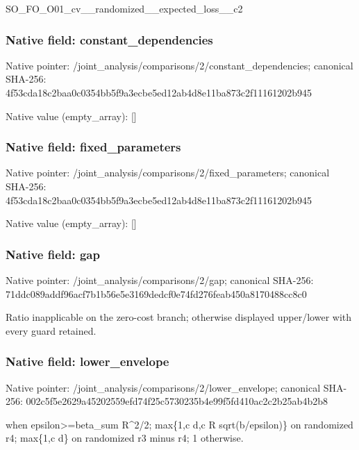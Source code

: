 \documentclass[10pt,a4paper]{article}
\begin{document}
\begingroup\raggedright\sloppy SO\_\allowbreak{}FO\_\allowbreak{}O01\_\allowbreak{}cv\_\allowbreak{}\_\allowbreak{}randomized\_\allowbreak{}\_\allowbreak{}expected\_\allowbreak{}loss\_\allowbreak{}\_\allowbreak{}c2\par\endgroup

\subsubsection{Native field: constant\_\allowbreak{}dependencies}
Native pointer: /joint\_\allowbreak{}analysis/comparisons/2/constant\_\allowbreak{}dependencies; canonical SHA-256: 4f53cda18c2baa0c0354bb5f9a3ecbe5ed12ab4d8e11ba873c2f11161202b945

Native value (empty\_\allowbreak{}array): []

\subsubsection{Native field: fixed\_\allowbreak{}parameters}
Native pointer: /joint\_\allowbreak{}analysis/comparisons/2/fixed\_\allowbreak{}parameters; canonical SHA-256: 4f53cda18c2baa0c0354bb5f9a3ecbe5ed12ab4d8e11ba873c2f11161202b945

Native value (empty\_\allowbreak{}array): []

\subsubsection{Native field: gap}
Native pointer: /joint\_\allowbreak{}analysis/comparisons/2/gap; canonical SHA-256: 71ddc089addf96acf7b1b56e5e3169dedcf0e74fd276feab450a8170488cc8c0

\begingroup\raggedright\sloppy Ratio inapplicable on the zero-cost branch;\allowbreak{} otherwise displayed upper/\allowbreak{}lower with every guard retained.\par\endgroup

\subsubsection{Native field: lower\_\allowbreak{}envelope}
Native pointer: /joint\_\allowbreak{}analysis/comparisons/2/lower\_\allowbreak{}envelope; canonical SHA-256: 002c5f5e2629a45202559efd74f25c5730235b4e99f5fd410ac2c2b25ab4b2b8

\begingroup\raggedright{} when epsilon>=\allowbreak{}beta\_\allowbreak{}sum R\textasciicircum{}2/\allowbreak{}2;\allowbreak{} max\{1,\allowbreak{}c d,\allowbreak{}c R sqrt(b/\allowbreak{}epsilon)\} on randomized r4;\allowbreak{} max\{1,\allowbreak{}c d\} on randomized r3 minus r4;\allowbreak{} 1 otherwise.\par\endgroup
\end{document}
